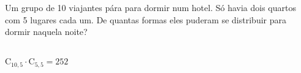 \begin{ex}
 Um grupo de 10 viajantes pára para dormir num hotel. Só havia dois quartos com 5 lugares cada um. De quantas formas eles puderam se distribuir para dormir naquela noite?
   \begin{sol}
     \phantom{A} \\
     $\mathrm{C}_{{10},5}\cdot\mathrm{C}_{5,5}=252$
   \end{sol}
\end{ex}
